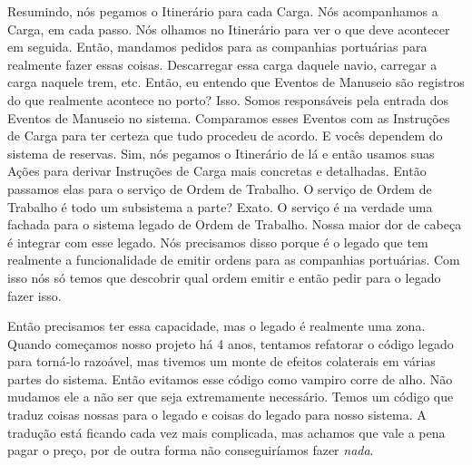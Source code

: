 \documentclass[12pt,play]{article}
\begin{document}
\scene
\lean Resumindo, nós pegamos o Itinerário para cada Carga. Nós acompanhamos a Carga, em cada passo. Nós olhamos no Itinerário para ver o que deve acontecer em seguida. Então, mandamos pedidos para as companhias portuárias para realmente fazer essas coisas. Descarregar essa carga daquele navio, carregar a carga naquele trem, etc.
\serg Então, eu entendo que Eventos de Manuseio são registros do que realmente acontece no porto?
\lean Isso. Somos responsáveis pela entrada dos Eventos de Manuseio no sistema. Comparamos esses Eventos com as Instruções de Carga para ter certeza que tudo procedeu de acordo.
\serg E vocês dependem do sistema de reservas.
\lean Sim, nós pegamos o Itinerário de lá e então usamos suas Ações para derivar Instruções de Carga mais concretas e detalhadas. Então passamos elas para o serviço de Ordem de Trabalho.
\serg O serviço de Ordem de Trabalho é todo um subsistema a parte?
\lean Exato. O serviço é na verdade uma fachada para o sistema legado de Ordem de Trabalho. Nossa maior dor de cabeça é integrar com esse legado. Nós precisamos disso porque é o legado que tem realmente a funcionalidade de emitir ordens para as companhias portuárias. Com isso nós só temos que descobrir qual ordem emitir e então pedir para o legado fazer isso.

Então precisamos ter essa capacidade, mas o legado é realmente uma zona. Quando começamos nosso projeto há 4 anos, tentamos refatorar o código legado para torná-lo razoável, mas tivemos um monte de efeitos colaterais em várias partes do sistema. Então evitamos esse código como vampiro corre de alho. Não mudamos ele a não ser que seja extremamente necessário. Temos um código que traduz coisas nossas para o legado e coisas do legado para nosso sistema. A tradução está ficando cada vez mais complicada, mas achamos que vale a pena pagar o preço, por de outra forma não conseguiríamos fazer \emph{nada}.
\narr {}
\end{document}
